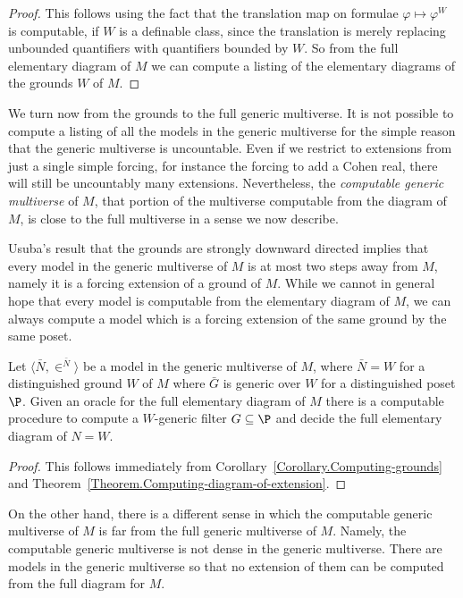 \documentclass{amsart}
\begin{document}
 \begin{proof}
 This follows using the fact that the translation map on formulae $\varphi \mapsto \varphi^W$ is computable, if $W$ is a definable class, since the translation is merely replacing unbounded quantifiers with quantifiers bounded by $W$. So from the full elementary diagram of $M$ we can compute a listing of the elementary diagrams of the grounds $W$ of $M$.
 \end{proof}
 
 We turn now from the grounds to the full generic multiverse. It is not possible to compute a listing of all the models in the generic multiverse for the simple reason that the generic multiverse is uncountable. Even if we restrict to extensions from just a single simple forcing, for instance the forcing to add a Cohen real, there will still be uncountably many extensions. Nevertheless, the \emph{computable generic multiverse} of $M$, that portion of the multiverse computable from the diagram of $M$, is close to the full multiverse in a sense we now describe.
 
 Usuba's result that the grounds are strongly downward directed \cite{usuba2017} implies
 that every model in the generic multiverse of $M$ is at most two steps away from $M$, namely it is a forcing extension of a ground of $M$. While we cannot in general hope that every model is computable from the elementary diagram of $M$, we can always compute a model which is a forcing extension of the same ground by the same poset.
 
 \begin{corollary}\label{Corollary.Computing-the-generic-multiverse}
 Let $\langle\bar N,\in^{\bar N}\rangle$ be a model in the generic multiverse of $M$, where $\bar N = W$ for a distinguished ground $W$ of $M$ where $\bar G$ is generic over $W$ for a distinguished poset $\P$. Given an oracle for the full elementary diagram of $M$ there is a computable procedure to compute a $W$-generic filter $G \subseteq \P$ and decide the full elementary diagram of $N = W$.
 \end{corollary}
 
 \begin{proof}
 This follows immediately from Corollary~\ref{Corollary.Computing-grounds} and Theorem~\ref{Theorem.Computing-diagram-of-extension}.
 \end{proof}
 
 On the other hand, there is a different sense in which the computable generic multiverse of $M$ is far from the full generic multiverse of $M$. Namely, the computable generic multiverse is not dense in the generic multiverse. There are models in the generic multiverse so that no extension of them can be computed from the full diagram for $M$.
 
\end{document}
